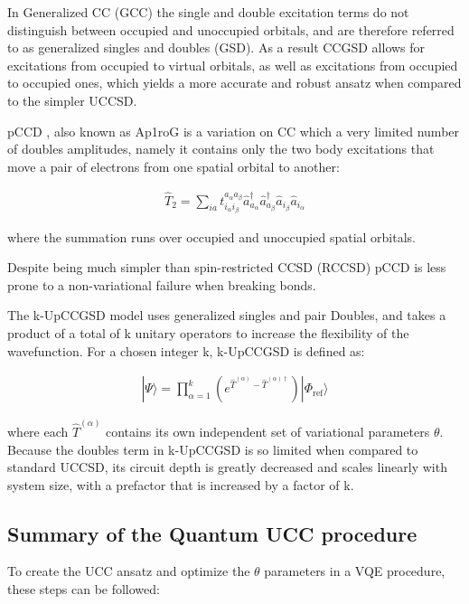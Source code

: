 \documentclass[twoside,twocolumn,9pt]{article}
\begin{document}
{In Generalized CC (GCC) the single and double excitation terms do not distinguish between occupied and unoccupied orbitals, and are therefore referred to as generalized singles and doubles (GSD). As a result CCGSD allows for excitations from occupied to virtual orbitals, as well as excitations from occupied to occupied ones, which yields a more accurate and robust ansatz when compared to the simpler UCCSD.

pCCD \cite{Stein2014}, also known as Ap1roG \cite{Limacher2013} is a variation on CC which a very limited number of doubles amplitudes, namely it contains only the two body excitations that move a pair of electrons from one spatial orbital to another:

\begin{align}
\hat{T}_2=\sum_{ia}t_{i_{\alpha}i_{\beta}}^{a_{\alpha}a_{\beta}}\hat{a}_{a_{\alpha}}^{\dagger}\hat{a}_{a_{\beta}}^{\dagger}\hat{a}_{i_{\beta}}\hat{a}_{i_{\alpha}}
\end{align}

where the summation runs over occupied and unoccupied spatial orbitals.

Despite being much simpler than spin-restricted CCSD (RCCSD) pCCD is less prone to a non-variational failure when breaking bonds.

The k-UpCCGSD model uses generalized singles and pair Doubles, and takes a product of a total of k unitary operators to increase the flexibility of the wavefunction. For a chosen integer k, k-UpCCGSD is defined as:

\begin{align}
|\Psi\rangle=\prod_{\alpha=1}^{k}(e^{\hat{T}^{(\alpha)}-\hat{T}^{(\alpha)\dagger}})|\Phi_{\text{ref}}\rangle
\end{align}

where each $\hat{T}^{(\alpha)}$ contains its own independent set of variational parameters $\theta$. Because the doubles term in k-UpCCGSD is so limited when compared to standard UCCSD, its circuit depth is greatly decreased and scales linearly with system size, with a prefactor that is increased by a factor of k.

\subsection{Summary of the Quantum UCC procedure}

To create the UCC ansatz and optimize the $\theta$ parameters in a VQE procedure, these steps can be followed:

}
\end{document}
